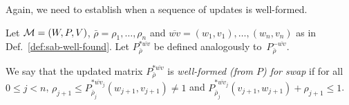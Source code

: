 Again, we need to establish when a sequence of updates is well-formed.

\begin{definition}
    \label{def:swap-well-found}
    Let $\mathcal{M}=(W,P,V)$, $\bar{\rho}=\rho_1,\dots,\rho_n$ and ${\overline{wv}}=(w_1,v_1),\ldots,(w_n,v_n)$ as in Def.~\ref{def:sab-well-found}. Let $P^{*\overline{wv}}_{\bar{\rho}}$
    be defined analogously to~$P^{-\overline{wv}}_{\bar{\rho}}$. 

    We say that the updated matrix $P^{*\overline{wv}}_{\bar{\rho}}$ is \emph{well-formed (from $P$) for swap} if for all $0\leq j < n$, $\rho_{j+1}\leq P^{*{\overline{wv}}_j}_{\bar{\rho}_j}(w_{j+1},v_{j+1})\neq 1$ and $P^{*{\overline{wv}}_j}_{\bar{\rho}_j}(v_{j+1},w_{j+1})+\rho_{j+1}\leq 1$. 
\end{definition}
